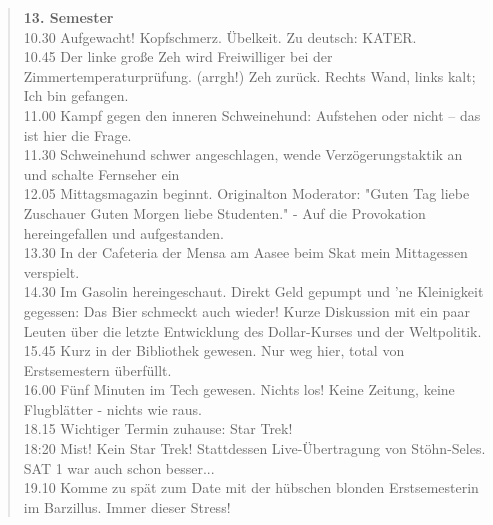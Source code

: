 \begin{verse}
\textbf{ 13. Semester }\\
10.30 Aufgewacht! Kopfschmerz. Übelkeit. Zu deutsch: KATER.\\ 
10.45 Der linke große Zeh wird Freiwilliger bei der Zimmertemperaturprüfung. (arrgh!) Zeh zurück. Rechts Wand, links kalt; Ich bin gefangen.\\ 
11.00 Kampf gegen den inneren Schweinehund: Aufstehen oder nicht -- das ist hier die Frage.\\ 
11.30 Schweinehund schwer angeschlagen, wende Verzögerungstaktik an und schalte Fernseher ein\\ 
12.05 Mittagsmagazin beginnt. Originalton Moderator: "Guten Tag liebe Zuschauer Guten Morgen liebe Studenten." - Auf die Provokation hereingefallen und aufgestanden.\\ 
13.30 In der Cafeteria der Mensa am Aasee beim Skat mein Mittagessen verspielt.\\ 
14.30 Im Gasolin hereingeschaut. Direkt Geld gepumpt und 'ne Kleinigkeit gegessen: Das Bier schmeckt auch wieder! Kurze Diskussion mit ein paar Leuten über die letzte Entwicklung des Dollar-Kurses und der Weltpolitik.\\ 
15.45 Kurz in der Bibliothek gewesen. Nur weg hier, total von Erstsemestern überfüllt.\\ 
16.00 Fünf Minuten im Tech gewesen. Nichts los! Keine Zeitung, keine Flugblätter - nichts wie raus.\\ 
18.15 Wichtiger Termin zuhause: Star Trek!\\ 
18:20 Mist! Kein Star Trek! Stattdessen Live-Übertragung von Stöhn-Seles. SAT 1 war auch schon besser...\\ 
19.10 Komme zu spät zum Date mit der hübschen blonden Erstsemesterin im Barzillus. Immer dieser Stress!\\ 

\end{verse}
